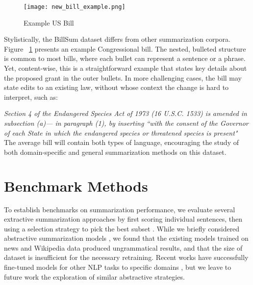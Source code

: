 \documentclass[11pt,a4paper]{article}
\begin{document}
\begin{figure}[h]
   \texttt{[image: new\_bill\_example.png]}
    \caption{Example US Bill}
    \label{fig:trickybill}
    \vspace{-1.2mm}
\end{figure}

Stylistically, the BillSum dataset differs from other summarization corpora. Figure ~\ref{fig:trickybill} presents an example Congressional bill. The nested, bulleted structure is common to most bills, where each bullet can represent a sentence or a phrase. Yet, content-wise, this is a straightforward example that states key details about the proposed grant in the outer bullets. In more challenging cases, the bill may state edits to an existing law, without whose context the change is hard to interpret, such as:

\textit{Section 4 of the Endangered Species Act of 1973 (16 U.S.C. 1533) is amended in subsection (a)— in paragraph (1), by inserting ``with the consent of the Governor of each State in which the endangered species or threatened species is present"}\\

The average bill will contain both types of language, encouraging the study of both domain-specific and general summarization methods on this dataset. 

\section{Benchmark Methods}
\label{sec:methods}
To establish benchmarks on summarization performance, we evaluate several extractive summarization approaches by first scoring individual sentences, then using a selection strategy to pick the best subset \cite{Carbonell:1998:UMD:290941.291025}. While we briefly considered abstractive summarization models \cite{N16-1012}, we found that the existing models trained on news and Wikipedia data produced ungrammatical results, and that the size of dataset is insufficient for the necessary retraining. Recent works have successfully fine-tuned models for other NLP tasks to specific domains \cite{biobert}, but we leave to future work the exploration of similar abstractive strategies.
\end{document}
